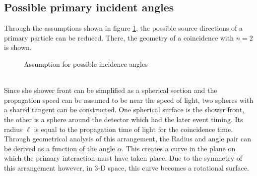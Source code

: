 \documentclass[abstract,toc,los,lof,english,10pt,glossary,acronyms]{jluthesis}
\begin{document}
\subsection{Possible primary incident angles}
Through the assumptions shown in figure \ref{fig:angle-assumptions}, the possible source directions of a primary particle can be reduced. There, the geometry of a coincidence with $n=2$ is shown.
\begin{figure}[ht!]
	\centering
	\caption{Assumption for possible incidence angles}
	\label{fig:angle-assumptions}
\end{figure} \\
Since she shower front can be simplified as a spherical section and the propagation speed can be assumed to be near the speed of light, two spheres with a shared tangent can be constructed. One spherical surface is the shower front, the other is a sphere around the detector which had the later event timing. Its radius $\ell$ is equal to the propagation time of light for the coincidence time. Through geometrical analysis of this arrangement, the Radius and angle pair can be derived as a function of the angle $\alpha$. This creates a curve in the plane on which the primary interaction must have taken place. Due to the symmetry of this arrangement however, in 3-D space, this curve becomes a rotational surface. \\
\end{document}
